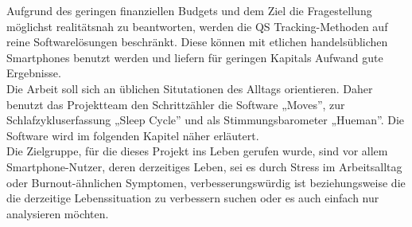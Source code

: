 Aufgrund des geringen finanziellen Budgets und dem Ziel die Fragestellung möglichst realitätsnah zu beantworten, werden die QS Tracking-Methoden auf reine Softwarelösungen beschränkt. 
Diese können mit etlichen handelsüblichen Smartphones benutzt werden und liefern für geringen Kapitals Aufwand gute Ergebnisse\cite{web:TrackingResults,web:AppPreis}. \\
Die Arbeit soll sich an üblichen Situtationen des Alltags orientieren. 
Daher benutzt das Projektteam den Schrittzähler die Software „Moves”, zur Schlafzykluserfassung „Sleep Cycle” und als Stimmungsbarometer „Hueman”.
Die Software wird im folgenden Kapitel näher erläutert. \\
Die Zielgruppe, für die dieses Projekt ins Leben gerufen wurde, sind vor allem Smartphone-Nutzer, deren derzeitiges Leben, sei es durch Stress im Arbeitsalltag oder Burnout-ähnlichen Symptomen, verbesserungswürdig ist beziehungsweise die die derzeitige Lebenssituation zu verbessern suchen oder es auch einfach nur analysieren möchten. 

